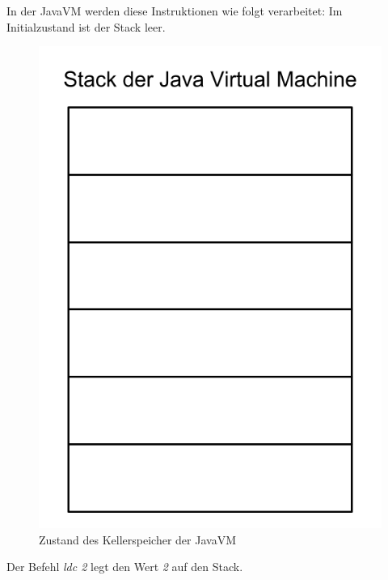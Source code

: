 In der JavaVM werden diese Instruktionen wie folgt verarbeitet:
Im Initialzustand ist der Stack leer.

\begin{figure}[h!]
\centering
\includegraphics[scale=0.2]{pics/stack_visual.png}
\caption{Zustand des Kellerspeicher der JavaVM}
\end{figure}

Der Befehl \textit{ldc 2} legt den Wert \textit{2} auf den Stack.

